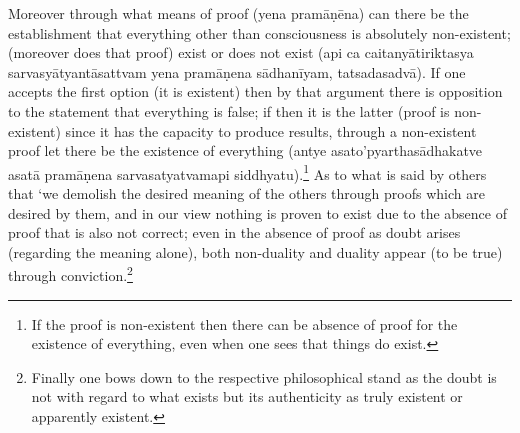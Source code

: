 \vskip 2pt

Moreover through what means of proof (yena pramāṇēna) can there be the establishment that everything other than consciousness is absolutely non-existent; (moreover does that proof) exist or does not exist (api ca caitanyātiriktasya sarvasyātyantāsattvam yena pramāṇena sādhanīyam, tatsadasadvā). If one accepts the first option (it is existent) then by that argument there is opposition to the statement that everything is false; if then it is the latter (proof is non-existent) since it has the capacity to produce results, through a non-existent proof let there be the existence of everything (antye asato’pyarthasādhakatve asatā pramāṇena sarvasatyatvamapi siddhyatu).\footnote{If the proof is non-existent then there can be absence of proof for the existence of everything, even when one sees that things do exist.} As to what is said by others that ‘we demolish the desired meaning of the others through proofs which are desired by them, and in our view nothing is proven to exist due to the absence of proof that is also not correct; even in the absence of proof as doubt arises (regarding the meaning alone), both non-duality and duality appear (to be true) through conviction.\footnote{Finally one bows down to the respective philosophical stand as the doubt is not with regard to what exists but its authenticity as truly existent or apparently existent.} 

\vskip 2pt

